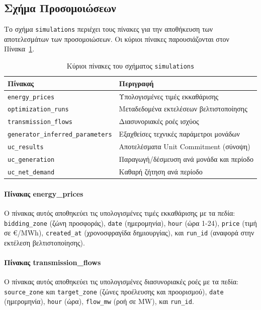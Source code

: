 \subsection{Σχήμα Προσομοιώσεων}
\label{subsec:simulations-schema}

Το σχήμα \texttt{simulations} περιέχει τους πίνακες για την αποθήκευση των αποτελεσμάτων των προσομοιώσεων. Οι κύριοι πίνακες παρουσιάζονται στον Πίνακα~\ref{tab:simulations-tables}.

\begin{table}[htbp]
\centering
\caption{Κύριοι πίνακες του σχήματος \texttt{simulations}}
\label{tab:simulations-tables}
\begin{tabular}{@{}p{5cm}p{8cm}@{}}
\toprule
\textbf{Πίνακας} & \textbf{Περιγραφή} \\
\midrule
\texttt{energy\_prices} & Υπολογισμένες τιμές εκκαθάρισης \\
\texttt{optimization\_runs} & Μεταδεδομένα εκτελέσεων βελτιστοποίησης \\
\texttt{transmission\_flows} & Διασυνοριακές ροές ισχύος \\
\texttt{generator\_inferred\_parameters} & Εξαχθείσες τεχνικές παράμετροι μονάδων \\
\texttt{uc\_results} & Αποτελέσματα Unit Commitment (σύνοψη) \\
\texttt{uc\_generation} & Παραγωγή/δέσμευση ανά μονάδα και περίοδο \\
\texttt{uc\_net\_demand} & Καθαρή ζήτηση ανά περίοδο \\
\bottomrule
\end{tabular}
\end{table}

\paragraph{Πίνακας energy\_prices}
Ο πίνακας αυτός αποθηκεύει τις υπολογισμένες τιμές εκκαθάρισης με τα πεδία: \texttt{bidding\_zone} (ζώνη προσφοράς), \texttt{date} (ημερομηνία), \texttt{hour} (ώρα 1-24), \texttt{price} (τιμή σε €/MWh), \texttt{created\_at} (χρονοσφραγίδα δημιουργίας), και \texttt{run\_id} (αναφορά στην εκτέλεση βελτιστοποίησης).

\paragraph{Πίνακας transmission\_flows}
Ο πίνακας αυτός αποθηκεύει τις υπολογισμένες διασυνοριακές ροές με τα πεδία: \texttt{source\_zone} και \texttt{target\_zone} (ζώνες προέλευσης και προορισμού), \texttt{date} (ημερομηνία), \texttt{hour} (ώρα), \texttt{flow\_mw} (ροή σε MW), και \texttt{run\_id}.

